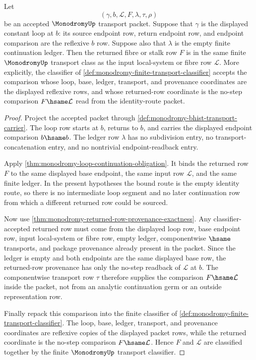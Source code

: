 \begin{lemma}
\label{lem:monodromy-constant-loop-returned-row-identity}
Let
$$
(\gamma,b,\mathcal L,F,\lambda,\tau,\rho)
$$
be an accepted $\MonodromyUp$ transport packet. Suppose that $\gamma$ is the displayed constant loop at $b$: its source endpoint row, return endpoint row, and endpoint comparison are the reflexive $b$ row. Suppose also that $\lambda$ is the empty finite continuation ledger. Then the returned fibre or stalk row $F$ is in the same finite $\MonodromyUp$ transport class as the input local-system or fibre row $\mathcal L$. More explicitly, the classifier of \autoref{def:monodromy-finite-transport-classifier} accepts the comparison whose loop, base, ledger, transport, and provenance coordinates are the displayed reflexive rows, and whose returned-row coordinate is the no-step comparison $F\hsame\mathcal L$ read from the identity-route packet.
\end{lemma}
\begin{proof}
Project the accepted packet through \autoref{def:monodromy-bhist-transport-carrier}. The loop row starts at $b$, returns to $b$, and carries the displayed endpoint comparison $b\hsame b$. The ledger row $\lambda$ has no subdivision entry, no transport-concatenation entry, and no nontrivial endpoint-readback entry.

Apply \autoref{thm:monodromy-loop-continuation-obligation}. It binds the returned row $F$ to the same displayed base endpoint, the same input row $\mathcal L$, and the same finite ledger. In the present hypotheses the bound route is the empty identity route, so there is no intermediate loop segment and no later continuation row from which a different returned row could be sourced.

Now use \autoref{thm:monodromy-returned-row-provenance-exactness}. Any classifier-accepted returned row must come from the displayed loop row, base endpoint row, input local-system or fibre row, empty ledger, componentwise $\hsame$ transports, and package provenance already present in the packet. Since the ledger is empty and both endpoints are the same displayed base row, the returned-row provenance has only the no-step readback of $\mathcal L$ at $b$. The componentwise transport row $\tau$ therefore supplies the comparison $F\hsame\mathcal L$ inside the packet, not from an analytic continuation germ or an outside representation row.

Finally repack this comparison into the finite classifier of \autoref{def:monodromy-finite-transport-classifier}. The loop, base, ledger, transport, and provenance coordinates are reflexive copies of the displayed packet rows, while the returned coordinate is the no-step comparison $F\hsame\mathcal L$. Hence $F$ and $\mathcal L$ are classified together by the finite $\MonodromyUp$ transport classifier.
\end{proof}
